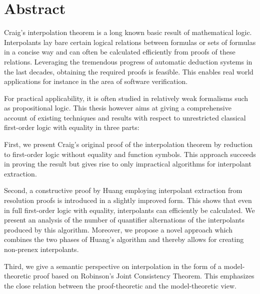 \chapter*{Abstract}

Craig's interpolation theorem is a long known basic result of mathematical logic.
Interpolants lay bare certain logical relations between formulas or sets of formulas in a concise way and can often be calculated efficiently from proofs of these relations.
Leveraging the tremendous
progress of automatic deduction systems in the last decades, obtaining the required proofs
is feasible. 
This enables real world applications for instance in the area of software verification.

For practical applicability, it is often studied in relatively weak formalisms such as propositional logic.
This thesis however aims at giving a comprehensive account of existing techniques and results with respect to unrestricted classical first-order logic with equality in three parts:

First, we present Craig's original proof of the interpolation theorem by reduction to first-order logic without equality and function symbols.
This approach succeeds in proving the result but gives rise to only impractical algorithms for interpolant extraction.

Second, a constructive proof by Huang employing interpolant extraction from resolution proofs is introduced in a slightly improved form.
This shows that even in full first-order logic with equality, interpolants can efficiently be calculated.
We present an analysis of the number of quantifier alternations of the interpolants produced by this algorithm.
Moreover, we propose a novel approach which combines the two phases of Huang's algorithm and thereby allows for creating non-prenex interpolants.

Third, we give a semantic perspective on interpolation in the form of a model-theoretic proof based on Robinson's Joint Consistency Theorem.
This emphasizes the close relation between the proof-theoretic and the model-theoretic view.






%
%
%
%
%
%
%
%
%
%
%
%
%
%
%
%
%
